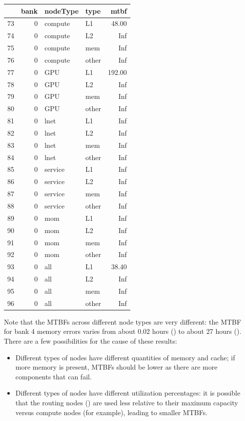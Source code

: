 \begin{t able}[t]
\begin{table}[t]
\centering
\begin{tabular}{rrllr}
  \hline
 & bank & nodeType & type & mtbf \\ 
  \hline
  73 &   0 & compute & L1 & 48.00 \\ 
  74 &   0 & compute & L2 & Inf \\ 
  75 &   0 & compute & mem & Inf \\ 
  76 &   0 & compute & other & Inf \\ 
  77 &   0 & GPU & L1 & 192.00 \\ 
  78 &   0 & GPU & L2 & Inf \\ 
  79 &   0 & GPU & mem & Inf \\ 
  80 &   0 & GPU & other & Inf \\ 
  81 &   0 & lnet & L1 & Inf \\ 
  82 &   0 & lnet & L2 & Inf \\ 
  83 &   0 & lnet & mem & Inf \\ 
  84 &   0 & lnet & other & Inf \\ 
  85 &   0 & service & L1 & Inf \\ 
  86 &   0 & service & L2 & Inf \\ 
  87 &   0 & service & mem & Inf \\ 
  88 &   0 & service & other & Inf \\ 
  89 &   0 & mom & L1 & Inf \\ 
  90 &   0 & mom & L2 & Inf \\ 
  91 &   0 & mom & mem & Inf \\ 
  92 &   0 & mom & other & Inf \\ 
  93 &   0 & all & L1 & 38.40 \\ 
  94 &   0 & all & L2 & Inf \\ 
  95 &   0 & all & mem & Inf \\ 
  96 &   0 & all & other & Inf \\ 
   \hline
\end{tabular}
\end{table}


Note that the MTBFs across different node types are very different: the MTBF for bank 4 memory errors varies from about 0.02 hours () to about 27 hours ().  There are a few possibilities for the cause of these results:

\begin{itemize}
\item Different types of nodes have different quantities of memory and cache; if more memory is present, MTBFs should be lower as there are more components that can fail.
\item Different types of nodes have different utilization percentages: it is possible that the routing nodes () are used less relative to their maximum capacity versus compute nodes (for example), leading to smaller MTBFs.
\end{itemize}


\end{t able}
